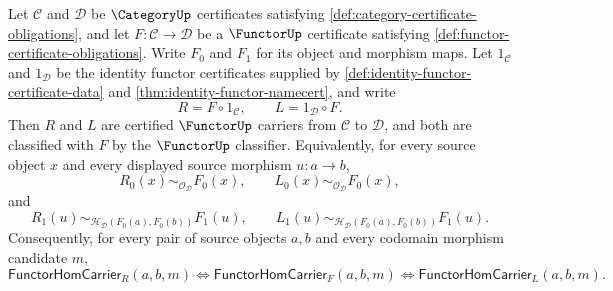 \begin{theorem}
\label{thm:functor-composition-identity-unit-laws}
Let $\mathcal C$ and $\mathcal D$ be $\CategoryUp$ certificates satisfying
\autoref{def:category-certificate-obligations}, and let
$F:\mathcal C\to\mathcal D$ be a $\FunctorUp$ certificate satisfying
\autoref{def:functor-certificate-obligations}. Write $F_0$ and $F_1$ for its
object and morphism maps. Let $1_{\mathcal C}$ and $1_{\mathcal D}$ be the
identity functor certificates supplied by
\autoref{def:identity-functor-certificate-data} and
\autoref{thm:identity-functor-namecert}, and write
$$
R=F\circ 1_{\mathcal C},
\qquad
L=1_{\mathcal D}\circ F.
$$
Then $R$ and $L$ are certified $\FunctorUp$ carriers from $\mathcal C$ to
$\mathcal D$, and both are classified with $F$ by the $\FunctorUp$ classifier.
Equivalently, for every source object $x$ and every displayed source morphism
$u:a\to b$,
$$
R_0(x)\sim_{\mathcal O_{\mathcal D}}F_0(x),
\qquad
L_0(x)\sim_{\mathcal O_{\mathcal D}}F_0(x),
$$
and
$$
R_1(u)\sim_{\mathcal H_{\mathcal D}(F_0(a),F_0(b))}F_1(u),
\qquad
L_1(u)\sim_{\mathcal H_{\mathcal D}(F_0(a),F_0(b))}F_1(u).
$$
Consequently, for every pair of source objects $a,b$ and every codomain
morphism candidate $m$,
$$
\mathsf{FunctorHomCarrier}_{R}(a,b,m)
\Longleftrightarrow
\mathsf{FunctorHomCarrier}_{F}(a,b,m)
\Longleftrightarrow
\mathsf{FunctorHomCarrier}_{L}(a,b,m).
$$
\end{theorem}
